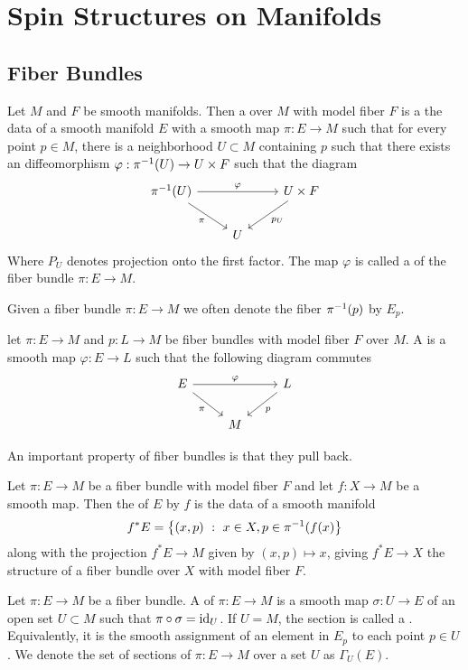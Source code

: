 \chapter{Spin Structures on Manifolds}
%
\section{Fiber Bundles}
%
\begin{defn}
Let $M$ and $F$ be smooth manifolds. Then a  over $M$ with
model fiber $F$ is a the data of a smooth manifold $E$ with a smooth map
$\pi : E \to M$ such that for every point $p \in M$, there is a neighborhood
$U \subset M$ containing $p$ such that there exists an diffeomorphism
$\varphi : \pi^{-1}(U) \to U \times F$ such that the diagram
\[\begin{tikzcd}
\pi\inv(U) \ar[rr, "\varphi"] \ar[dr, "\pi"']&& U \times F \ar[dl, "p_U"] \\
& U
\end{tikzcd}\]
Where $P_U$ denotes projection onto the first factor. The map $\varphi$ is
called a  of the fiber bundle $\pi : E \to M$.
\end{defn}
%
Given a fiber bundle $\pi : E \to M$ we often denote the fiber $\pi^{-1}(p)$
by $E_p$.
%
\begin{defn}
let $\pi : E \to M$ and $p : L \to M$ be fiber bundles with model fiber $F$
over $M$. A  is a smooth map $\varphi : E \to L$ such
that the following diagram commutes
\[\begin{tikzcd}
E \ar[dr, "\pi"']\ar[rr,"\varphi"] & & L \ar[dl, "p"] \\
& M
\end{tikzcd}\]
\end{defn}
%
An important property of fiber bundles is that they pull back.
\begin{defn}
Let $\pi : E \to M$ be a fiber bundle with model fiber $F$
and let $f : X \to M$ be a smooth map. Then the  of $E$ by $f$ is
the data of a smooth manifold
\[
f^*E = \left\lbrace (x, p)~:~ x \in X, p \in \pi^{-1}(f(x)  \right\rbrace
\]
along with the projection $f^*E \to M$ given by $(x,p) \mapsto x$, giving
$f^*E \to X$ the structure of a fiber bundle over $X$ with model fiber $F$.
\end{defn}
%
\begin{defn}
Let $\pi : E \to M$ be a fiber bundle. A  of $\pi : E \to M$
is a smooth map $\sigma : U \to E$ of an open set $U \subset M$ such that
$\pi \circ \sigma = \operatorname{id}_U$. If $U = M$, the section is called a .
Equivalently, it is the smooth assignment of an element in $E_p$ to each point
$p \in U$. We denote the set of sections of $\pi : E \to M$ over a set $U$
as $\Gamma_U(E)$.
\end{defn}

